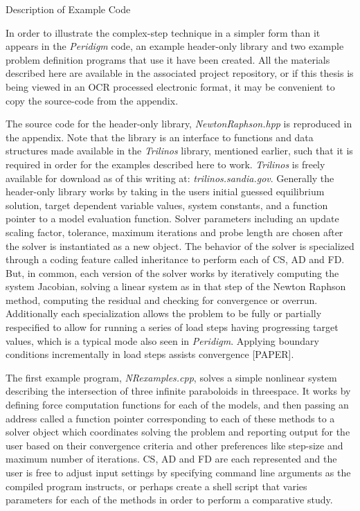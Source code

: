 Description of Example Code

In order to illustrate the complex-step technique in a simpler form than it
appears in the \emph{Peridigm} code, an example header-only library and two
example problem definition programs that use it have been created. All the
materials described here are available in the associated project repository, 
or if this thesis is being viewed in an OCR processed electronic format, 
it may be convenient to copy the source-code from the appendix.

The source code for the header-only library, \emph{NewtonRaphson.hpp} is
reproduced in the appendix. Note that the library is an interface to functions
and data structures made available in the \emph{Trilinos} library, mentioned
earlier, such that it is required in order for the examples described here to
work. \emph{Trilinos} is freely available for download as of this writing at:
\emph{trilinos.sandia.gov}. Generally the header-only library works by taking
in the users initial guessed equilibrium solution, target dependent variable
values, system constants, and a function pointer to a model evaluation
function. Solver parameters including an update scaling factor, tolerance,
maximum iterations and probe length are chosen after the solver is
instantiated as a new object. The behavior of the solver is specialized through
a coding feature called inheritance to perform each of CS, AD and FD.  But, in
common, each version of the solver works by iteratively computing the system
Jacobian, solving a linear system as in that step of the Newton Raphson method,
computing the residual and checking for convergence or overrun.  Additionally
each specialization allows the problem to be fully or partially respecified to
allow for running a series of load steps having progressing target values,
which is a typical mode also seen in \emph{Peridigm}. Applying boundary
conditions incrementally in load steps assists convergence [PAPER].

The first example program, \emph{NRexamples.cpp}, solves a simple nonlinear
system describing the intersection of three infinite paraboloids in threespace.
It works by defining force computation functions for each of the models, and
then passing an address called a function pointer corresponding to each of
these methods to a solver object which coordinates solving the problem and
reporting output for the user based on their convergence criteria and other
preferences like step-size and maximum number of iterations. CS, AD and FD are
each represented and the user is free to adjust input settings by specifying
command line arguments as the compiled program instructs, or perhaps create a
shell script that varies parameters for each of the methods in order to perform
a comparative study.

